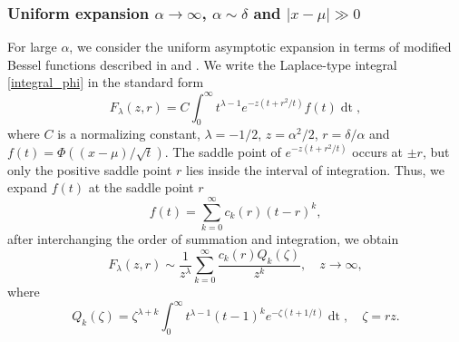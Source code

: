\documentclass[10pt,a4paper,oneside]{article}
\numberwithin{equation}{section}
\begin{document}
\subsubsection{Uniform expansion $\alpha \to \infty$, $\alpha \sim \delta$ and $|x-\mu| \gg 0$}\label{uniform_expansion_alpha_large}
For large $\alpha$, we consider the uniform asymptotic expansion in terms of modified Bessel functions described in \cite{Temme1990c} and \cite[\S 27]{Temme2015}. We write the Laplace-type integral \eqref{integral_phi} in the standard form
\begin{equation*}
F_{\lambda}(z, r) = C\int_0^{\infty} t^{\lambda - 1} e^{-z\left(t + r^2/t\right)} f(t) \mathop{dt},
\end{equation*}
where $C$ is a normalizing constant, $\lambda=-1/2$, $z = \alpha^2/2$, $r=\delta/\alpha$ and $f(t) = \Phi((x-\mu)/\sqrt{t})$. The saddle point of $e^{-z\left(t + r^2/t\right)}$ occurs at $\pm r$, but only the positive saddle point $r$ lies inside the interval of integration. Thus, we expand $f(t)$ at the saddle point $r$
\begin{equation*}
f(t) = \sum_{k=0}^{\infty} c_k(r)(t-r)^k,
\end{equation*}
after interchanging the order of summation and integration, we obtain 
\begin{equation}
F_{\lambda}(z, r) \sim \frac{1}{z^{\lambda}} \sum_{k=0}^{\infty} \frac{c_k(r) Q_k(\zeta)}{z^k}, \quad z \to \infty,
\end{equation}
where
\begin{equation*}
Q_k(\zeta) = \zeta^{\lambda + k}\int_0^{\infty} t^{\lambda - 1}(t-1)^k e^{-\zeta(t + 1/t)} \mathop{dt}, \quad \zeta = rz.
\end{equation*}
\end{document}
